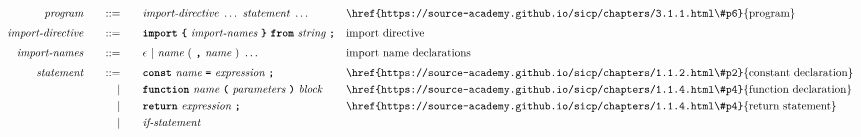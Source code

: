 \begin{alignat*}{9}
&& \textit{program}    &&\quad ::= &\quad && \textit{import-directive} \ \ldots\ \textit{statement} \ \ldots
                                                           && \textrm{\href{https://source-academy.github.io/sicp/chapters/3.1.1.html\#p6}{program}} \\[1mm]
&& \textit{import-directive}    &&\quad ::= &\quad && \textbf{\texttt{import}}\ \textbf{\texttt{\{}}\ \textit{import-names} \ \textbf{\texttt{\}}}\ \textbf{\texttt{from}}\  \textit{string} \ \textbf{\texttt{;}}
                                                           && \textrm{import directive} \\[1mm]
&& \textit{import-names}  && ::= &\quad && \epsilon\ | \ \textit{name}\ (
                                                               \ \textbf{\texttt{,}} \
                                                                 \textit{name} \ 
                                                                      )\ \ldots
                                                            && \textrm{import name declarations} \\[1mm]
&& \textit{statement}    &&\quad ::= &\quad && \textbf{\texttt{const}}\  \textit{name} \ 
                                           \textbf{\texttt{=}}\  \textit{expression} \ \textbf{\texttt{;}}
                                                           && \textrm{\href{https://source-academy.github.io/sicp/chapters/1.1.2.html\#p2}{constant declaration}} \\
&&                       && |   &\quad && \textbf{\texttt{function}}\  \textit{name} \ 
                                   \textbf{\texttt{(}}\  \textit{parameters} \ \textbf{\texttt{)}}\ \textit{block} \quad
                                                           && \textrm{\href{https://source-academy.github.io/sicp/chapters/1.1.4.html\#p4}{function declaration}}\\
&&                       && |   &\quad && \textbf{\texttt{return}}\  \textit{expression} \ \textbf{\texttt{;}}
                                                           && \textrm{\href{https://source-academy.github.io/sicp/chapters/1.1.4.html\#p4}{return statement}}\\
&&                       && |   &\quad && \textit{if-statement} \quad

\end{alignat*}
